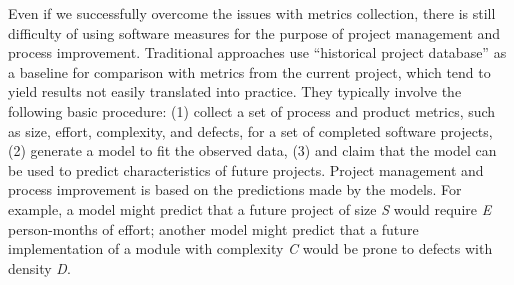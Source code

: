 



	

Even if we successfully overcome the issues with metrics collection, there is still difficulty of using software measures for the purpose of project management and process improvement. Traditional approaches use ``historical project database'' as a baseline for comparison with metrics from the current project, which tend to yield results not easily translated into practice. They typically involve the following basic procedure: (1) collect a set of process and product metrics, such as size, effort, complexity, and defects, for a set of completed software projects, (2) generate a model to fit the observed data, (3) and claim that the model can be used to predict characteristics of future projects. Project management and process improvement is based on the predictions made by the models. For example, a model might predict that a future project of size \textit{S} would require \textit{E} person-months of effort; another model might predict that a future implementation of a module with complexity \textit{C} would be prone to defects with density \textit{D}. 

